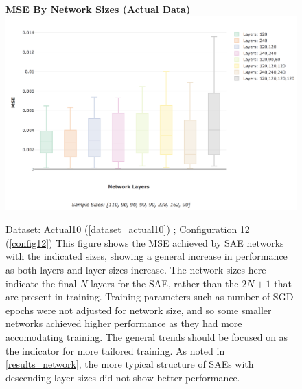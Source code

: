 \documentclass[a4paper,11pt,oneside]{article}
\theoremstyle{plain}
\theoremstyle{definition}
\begin{document}
\begin{figure}[H]
	\centering 
	\textbf{MSE By Network Sizes (Actual Data)}
	\includegraphics[scale=0.25]{images/results/network/actual_sae_mse_box.png} 
	\caption[MSE By Network Sizes (Actual Data)]{Dataset: Actual10 (\ref{dataset_actual10}) ; Configuration 12 (\ref{config12})
		\newline This figure shows the MSE achieved by SAE networks with the indicated sizes, showing a general increase in performance as both layers and layer sizes increase. The network sizes here indicate the final $N$ layers for the SAE, rather than the $2N + 1$ that are present in training. Training parameters such as number of SGD epochs were not adjusted for network size, and so some smaller networks achieved higher performance as they had more accomodating training. The general trends should be focused on as the indicator for more tailored training. As noted in \ref{results_network}, the more typical structure of SAEs with descending layer sizes did not show better performance.}
	\label{figure-actual_sae_mse_box}
\end{figure}
\end{document}
